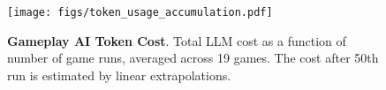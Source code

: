 \begin{figure}[ht]
    
  \centering
  \texttt{[image: figs/token\_usage\_accumulation.pdf]}
  \caption{\textbf{Gameplay AI Token Cost}. Total LLM cost as a function of number of game runs,  averaged across 19 games. The cost after 50th run is estimated by linear extrapolations.
  }
  \label{fig:token_cost}

\end{figure}

